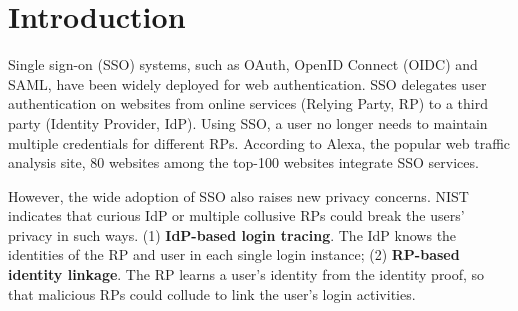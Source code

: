 \section{Introduction}
\label{sec:intro}
Single sign-on (SSO) systems, such as OAuth, OpenID Connect (OIDC) and SAML, have been widely deployed for web authentication.
SSO delegates user authentication on websites from online services (Relying Party, RP) to a third party (Identity Provider, IdP).
Using SSO, a user no longer needs to maintain multiple credentials for different RPs.
According to Alexa, the popular web traffic analysis site, 80 websites among the top-100 websites integrate SSO services.

However, the wide adoption of SSO also raises new privacy concerns. 
NIST~\cite{NIST2017draft} indicates that curious IdP or multiple collusive RPs could break the users' privacy in such ways. (1) \textbf{IdP-based login tracing}. The IdP knows the identities of the RP and user in each single login instance; (2) \textbf{RP-based identity linkage}. The RP learns a user's identity from the identity proof, so that malicious RPs could collude to link the user's login activities.
\begin{comment}
\item {\em IdP-based login tracing}. The IdP knows the identities of the RP and user in each single login instance.
\item {\em RP-based identity linkage}. The RP learns a user's identity from the identity proof, so that malicious RPs could collude to link the user's login activities.
\end{comment}

